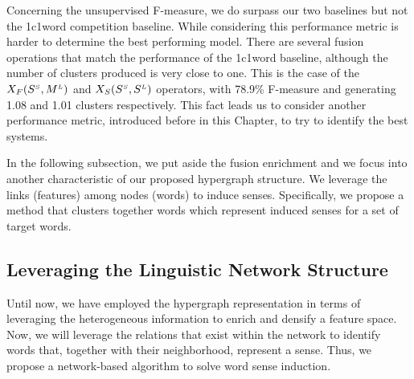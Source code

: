 Concerning the unsupervised F-measure, we do surpass our two baselines but not the 1c1word competition baseline. While considering this performance metric is harder to determine the best performing model. There are several fusion operations that match the performance of the 1c1word baseline, although the number of clusters produced is very close to one. This is the case of the $X_F(S^{\scriptscriptstyle S},M^{\scriptscriptstyle L})$ and $X_S(S^{\scriptscriptstyle S},S^{\scriptscriptstyle L})$ operators, with 78.9\% F-measure and generating 1.08 and 1.01 clusters respectively. This fact leads us to consider another performance metric, introduced before in this Chapter, to try to identify the best systems.




In the following subsection, we put aside the fusion enrichment and we focus into another characteristic of our proposed hypergraph structure. We leverage the links (features) among nodes (words) to induce senses. Specifically, we propose a method that clusters together words which represent induced senses for a set of target words.


\subsection{Leveraging the Linguistic Network Structure}
Until now, we have employed the hypergraph representation in terms of leveraging the heterogeneous information to enrich and densify a feature space.
Now, we will leverage the relations that exist within the network to identify words that, together with their neighborhood, represent a sense. Thus, we propose a network-based algorithm to solve word sense induction. 






%



